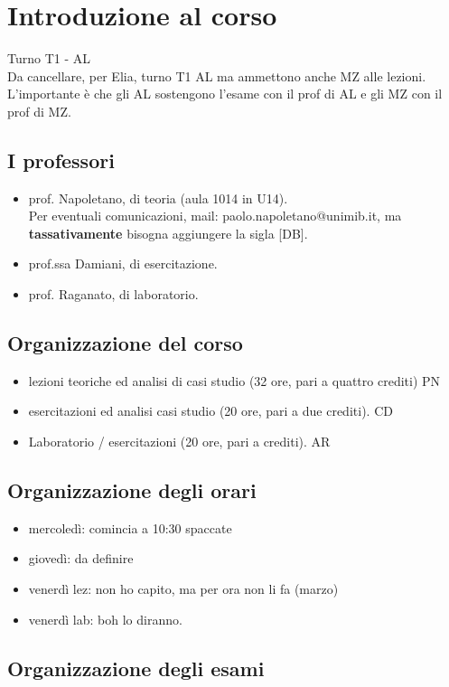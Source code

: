 \chapter{Introduzione al corso}
Turno T1 - AL
\\Da cancellare, per Elia, turno T1 AL ma ammettono anche MZ alle lezioni. L'importante è che gli AL sostengono l'esame con il prof di AL e gli MZ con il prof di MZ.
\section{I professori}
\begin{itemize}
    \item prof. Napoletano, di teoria (aula 1014 in U14).
    \\Per eventuali comunicazioni, mail: paolo.napoletano@unimib.it, ma \textbf{tassativamente} bisogna aggiungere la sigla [DB].
    \item prof.ssa Damiani, di esercitazione.
    \item prof. Raganato, di laboratorio.
\end{itemize}

\section{Organizzazione del corso}
\begin{itemize}
    \item lezioni teoriche ed analisi di casi studio (32 ore, pari a quattro crediti) PN 
    \item esercitazioni ed analisi casi studio (20 ore, pari a due crediti). CD 
    \item Laboratorio / esercitazioni (20 ore, pari a crediti). AR
\end{itemize}

\section{Organizzazione degli orari}
\begin{itemize}
    \item mercoledì: comincia a 10:30 spaccate
    \item giovedì: da definire
    \item venerdì lez: non ho capito, ma per ora non li fa (marzo)
    \item venerdì lab: boh lo diranno.
\end{itemize}

\section{Organizzazione degli esami}
